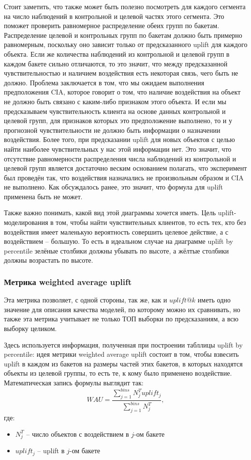 Стоит заметить, что также может быть полезно посмотреть для каждого сегмента на число наблюдений в контрольной и целевой частях этого сегмента. Это поможет проверить равномерное распределение обеих групп по бакетам. Распределение целевой и контрольных групп по бакетам должно быть примерно равномерным, поскольку оно зависит только от предсказанного uplift для каждого объекта. Если же количества наблюдений из контрольной и целевой групп в каждом бакете сильно отличаются, то это значит, что между предсказанной чувствительностью и наличием воздействия есть некоторая связь, чего быть не должно. Проблема заключается в том, что мы ожидаем выполнения предположения CIA, которое говорит о том, что наличие воздействия на объект не должно быть связано с каким-либо признаком этого объекта. И если мы предсказываем чувствительность клиента на основе данных контрольной и целевой групп, для признаков которых это предположение выполнено, то и у прогнозной чувствительности не должно быть информации о назначении воздействия. Более того, при предсказании uplift для новых объектов с целью найти наиболее чувствительных у нас этой информации нет. Это значит, что отсутствие равномерности распределения числа наблюдений из контрольной и целевой групп является достаточно веским основанием полагать, что эксперимент был проведён так, что воздействия назначались не произвольным образом и CIA не выполнено. Как обсуждалось ранее, это значит, что формула для uplift применена быть не может.

Также важно понимать, какой вид этой диаграммы хочется иметь. Цель uplift-моделирования в том, чтобы найти чувствительных клиентов, то есть тех, кто без воздействия имеет маленькую вероятность совершить целевое действие, а с воздействием -- большую. То есть в идеальном случае на диаграмме uplift by percentile зелёные столбики должны убывать по высоте, а жёлтые столбики должны возрастать по высоте.



\subsubsection*{Метрика weighted average uplift}

Эта метрика позволяет, с одной стороны, так же, как и $uplift@k$ иметь одно значение для описания качества моделей, по которому можно их сравнивать, но также эта метрика учитывает не только ТОП выборки по предсказаниям, а всю выборку целиком.

Здесь используется информация, полученная при построении табллицы uplift by percentile: идея метрики weighted average uplift состоит в том, чтобы взвесить uplift в каждом из бакетов на размеры частей этих бакетов, в которых находятся объекты из целевой группы, то есть те, к кому было применено воздействие. Математическая запись формулы выглядит так:
$$
    WAU = \frac{
        \sum\limits_{j=1}^{bins} N_j^T uplift_j
    }{
        \sum\limits_{j=1}^{bins} N_j^T
    }
    ,
$$
где:
\begin{itemize}
    \item $N_j^T$ -- число объектов с воздействием в $j$-ом бакете
    \item $uplift_j$ -- uplift в $j$-ом бакете
\end{itemize}

